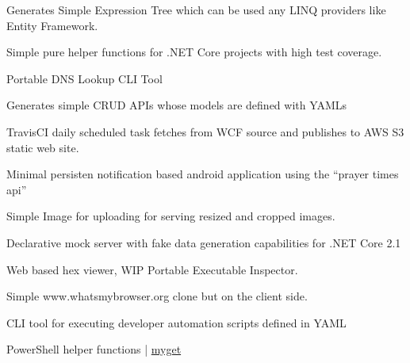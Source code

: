 
\begin{cvskills}

{
Generates Simple Expression Tree which can be used any LINQ providers like Entity Framework.
}

{
Simple pure helper functions for .NET Core projects with high test coverage.
}

{
Portable DNS Lookup CLI Tool
}

{
Generates simple CRUD APIs whose models are defined with YAMLs
}

{
TravisCI daily scheduled task fetches from WCF source and publishes to AWS S3 static web site.
}

{
Minimal persisten notification based android application using the ``prayer times api''
}

{
Simple Image for uploading for serving resized and cropped images.
}

{
Declarative mock server with fake data generation capabilities for .NET Core 2.1
}

{
Web based hex viewer, WIP Portable Executable Inspector.
}

{
Simple www.whatsmybrowser.org clone but on the client side.
}

{
CLI tool for executing developer automation scripts defined in YAML
}

{
PowerShell helper functions
|
{
  \href{https://www.myget.org/feed/guneysu/package/nuget/_}{myget \faExternalLink}
}
}

\end{cvskills}



